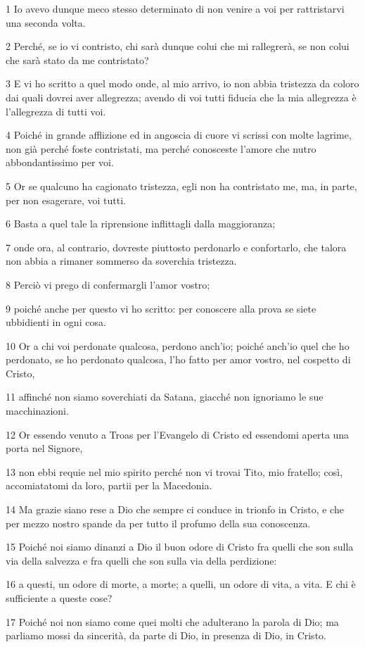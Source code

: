 \par 1 Io avevo dunque meco stesso determinato di non venire a voi per rattristarvi una seconda volta.
\par 2 Perché, se io vi contristo, chi sarà dunque colui che mi rallegrerà, se non colui che sarà stato da me contristato?
\par 3 E vi ho scritto a quel modo onde, al mio arrivo, io non abbia tristezza da coloro dai quali dovrei aver allegrezza; avendo di voi tutti fiducia che la mia allegrezza è l'allegrezza di tutti voi.
\par 4 Poiché in grande afflizione ed in angoscia di cuore vi scrissi con molte lagrime, non già perché foste contristati, ma perché conosceste l'amore che nutro abbondantissimo per voi.
\par 5 Or se qualcuno ha cagionato tristezza, egli non ha contristato me, ma, in parte, per non esagerare, voi tutti.
\par 6 Basta a quel tale la riprensione inflittagli dalla maggioranza;
\par 7 onde ora, al contrario, dovreste piuttosto perdonarlo e confortarlo, che talora non abbia a rimaner sommerso da soverchia tristezza.
\par 8 Perciò vi prego di confermargli l'amor vostro;
\par 9 poiché anche per questo vi ho scritto: per conoscere alla prova se siete ubbidienti in ogni cosa.
\par 10 Or a chi voi perdonate qualcosa, perdono anch'io; poiché anch'io quel che ho perdonato, se ho perdonato qualcosa, l'ho fatto per amor vostro, nel cospetto di Cristo,
\par 11 affinché non siamo soverchiati da Satana, giacché non ignoriamo le sue macchinazioni.
\par 12 Or essendo venuto a Troas per l'Evangelo di Cristo ed essendomi aperta una porta nel Signore,
\par 13 non ebbi requie nel mio spirito perché non vi trovai Tito, mio fratello; così, accomiatatomi da loro, partii per la Macedonia.
\par 14 Ma grazie siano rese a Dio che sempre ci conduce in trionfo in Cristo, e che per mezzo nostro spande da per tutto il profumo della sua conoscenza.
\par 15 Poiché noi siamo dinanzi a Dio il buon odore di Cristo fra quelli che son sulla via della salvezza e fra quelli che son sulla via della perdizione:
\par 16 a questi, un odore di morte, a morte; a quelli, un odore di vita, a vita. E chi è sufficiente a queste cose?
\par 17 Poiché noi non siamo come quei molti che adulterano la parola di Dio; ma parliamo mossi da sincerità, da parte di Dio, in presenza di Dio, in Cristo.

